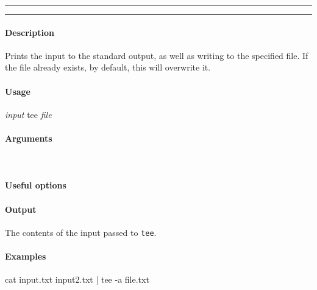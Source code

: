 \hrule
\vspace{1mm}
\hrule
\vspace{4mm}

\paragraph{Description}
\indentpar \raggedright \textrm{Prints the input to the standard output, as well as writing to the specified file. If the file already exists, by default, this will overwrite it.}\\

\paragraph{Usage}
\indentpar \textit{input} tee \textit{file}

\paragraph{Arguments}
\indentpar {}\\
\indentpar {}

\paragraph{Useful options}
\indentpar {}

\paragraph{Output}
\indentpar \textrm{The contents of the input passed to \texttt{tee}.}

\paragraph{Examples}
\indentpar cat input.txt input2.txt | tee -a file.txt

\vspace{20mm}